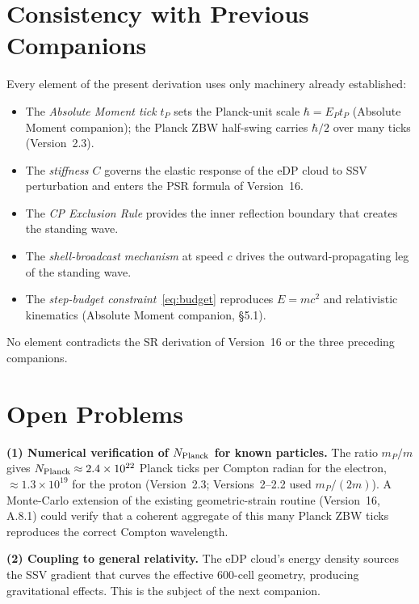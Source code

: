 \documentclass[12pt]{article}
\newcommand{\EP}{E_P}
\newcommand{\tP}{t_P}
\newcommand{\mP}{m_P}
\begin{document}
\section{Consistency with Previous Companions}
\label{sec:consistency}

Every element of the present derivation uses only machinery already
established:

\begin{itemize}[noitemsep]
  \item The \emph{Absolute Moment tick} $\tP$ sets the Planck-unit scale
    $\hbar = \EP\tP$ (Absolute Moment companion); the Planck ZBW half-swing
    carries $\hbar/2$ over many ticks (Version~2.3).
  \item The \emph{stiffness $C$} governs the elastic response of the eDP
    cloud to SSV perturbation and enters the PSR formula of Version~16.
  \item The \emph{CP Exclusion Rule} provides the inner reflection boundary
    that creates the standing wave.
  \item The \emph{shell-broadcast mechanism} at speed $c$ drives the
    outward-propagating leg of the standing wave.
  \item The \emph{step-budget constraint}~\eqref{eq:budget} reproduces
    $E=mc^2$ and relativistic kinematics (Absolute Moment companion, \S5.1).
\end{itemize}

No element contradicts the SR derivation of Version~16 or the three
preceding companions.

\section{Open Problems}
\label{sec:open}

\textbf{(1) Numerical verification of $N_{\rm Planck}$ for known particles.}
The ratio $\mP/m$ gives $N_{\rm Planck}\approx2.4\times10^{22}$ Planck ticks per
Compton radian for the electron, $\approx1.3\times10^{19}$ for the proton
(Version~2.3; Versions~2--2.2 used $\mP/(2m)$).  A Monte-Carlo
extension of the existing geometric-strain routine (Version~16, A.8.1)
could verify that a coherent aggregate of this many Planck ZBW ticks
reproduces the correct Compton wavelength.

\textbf{(2) Coupling to general relativity.}  The eDP cloud's energy
density sources the SSV gradient that curves the effective 600-cell
geometry, producing gravitational effects.  This is the subject of the next
companion.
\end{document}
